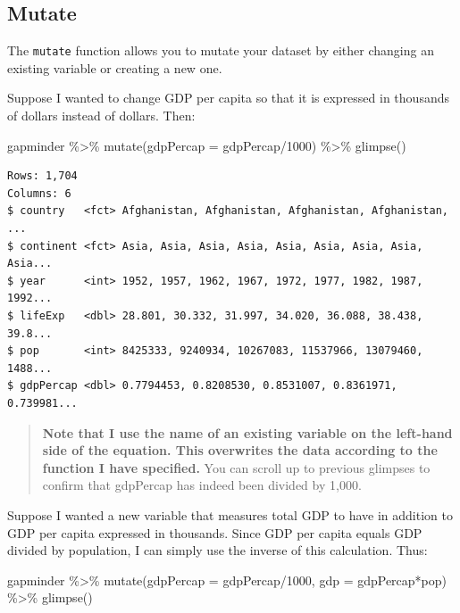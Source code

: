 \documentclass[
]{book}
\makeatletter
\newenvironment{Shaded}{\begin{snugshade}}{\end{snugshade}}
\newcommand{\AttributeTok}[1]{\textcolor[rgb]{0.61,0.61,0.61}{#1}}
\newcommand{\DecValTok}[1]{\textcolor[rgb]{0.06,0.06,0.06}{#1}}
\newcommand{\FunctionTok}[1]{\textcolor[rgb]{0,0,0}{#1}}
\newcommand{\NormalTok}[1]{#1}
\newcommand{\SpecialCharTok}[1]{\textcolor[rgb]{0,0,0}{#1}}
\newenvironment{kframe}{%
\medskip{}
\setlength{\fboxsep}{.8em}
 \def\at@end@of@kframe{}%
 \ifinner\ifhmode%
  \def\at@end@of@kframe{\end{minipage}}%
  \begin{minipage}{\columnwidth}%
 \fi\fi%
 \def\FrameCommand##1{\hskip\@totalleftmargin \hskip-\fboxsep
 \colorbox{shadecolor}{##1}\hskip-\fboxsep
     \hskip-\linewidth \hskip-\@totalleftmargin \hskip\columnwidth}%
 \MakeFramed {\advance\hsize-\width
   \@totalleftmargin\z@ \linewidth\hsize
   \@setminipage}}%
 {\par\unskip\endMakeFramed%
 \at@end@of@kframe}
\renewenvironment{Shaded}{\begin{kframe}}{\end{kframe}}
\makeatother
\begin{document}
\hypertarget{mutate}{%
\subsection{Mutate}\label{mutate}}

The \texttt{mutate} function allows you to mutate your dataset by either changing an existing variable or creating a new one.

Suppose I wanted to change GDP per capita so that it is expressed in thousands of dollars instead of dollars. Then:

\begin{Shaded}
\begin{Highlighting}[]
\NormalTok{gapminder }\SpecialCharTok{\%\textgreater{}\%} 
  \FunctionTok{mutate}\NormalTok{(}\AttributeTok{gdpPercap =}\NormalTok{ gdpPercap}\SpecialCharTok{/}\DecValTok{1000}\NormalTok{) }\SpecialCharTok{\%\textgreater{}\%} 
  \FunctionTok{glimpse}\NormalTok{()}
\end{Highlighting}
\end{Shaded}

\begin{verbatim}
Rows: 1,704
Columns: 6
$ country   <fct> Afghanistan, Afghanistan, Afghanistan, Afghanistan, ...
$ continent <fct> Asia, Asia, Asia, Asia, Asia, Asia, Asia, Asia, Asia...
$ year      <int> 1952, 1957, 1962, 1967, 1972, 1977, 1982, 1987, 1992...
$ lifeExp   <dbl> 28.801, 30.332, 31.997, 34.020, 36.088, 38.438, 39.8...
$ pop       <int> 8425333, 9240934, 10267083, 11537966, 13079460, 1488...
$ gdpPercap <dbl> 0.7794453, 0.8208530, 0.8531007, 0.8361971, 0.739981...
\end{verbatim}

\begin{quote}
\textbf{Note that I use the name of an existing variable on the left-hand side of the equation. This overwrites the data according to the function I have specified.} You can scroll up to previous glimpses to confirm that gdpPercap has indeed been divided by 1,000.
\end{quote}

Suppose I wanted a new variable that measures total GDP to have in addition to GDP per capita expressed in thousands. Since GDP per capita equals GDP divided by population, I can simply use the inverse of this calculation. Thus:

\begin{Shaded}
\begin{Highlighting}[]
\NormalTok{gapminder }\SpecialCharTok{\%\textgreater{}\%} 
  \FunctionTok{mutate}\NormalTok{(}\AttributeTok{gdpPercap =}\NormalTok{ gdpPercap}\SpecialCharTok{/}\DecValTok{1000}\NormalTok{,}
         \AttributeTok{gdp =}\NormalTok{ gdpPercap}\SpecialCharTok{*}\NormalTok{pop) }\SpecialCharTok{\%\textgreater{}\%} 
  \FunctionTok{glimpse}\NormalTok{()}
\end{Highlighting}
\end{Shaded}
\end{document}
